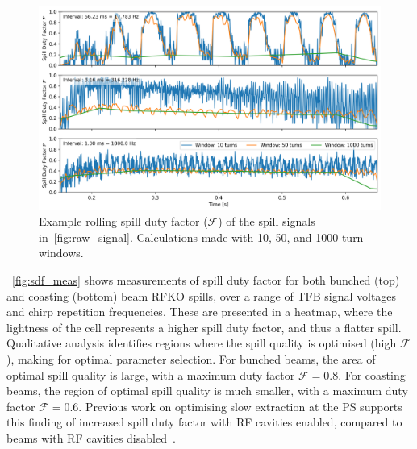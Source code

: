 \documentclass[a4paper,twoside,11pt]{report}
\begin{document}
\begin{figure}
  \centering
  \includegraphics[width=0.8\linewidth]{sdfs.png}
  \caption[Example spill duty factor calculations]{Example rolling spill duty factor ($\mathcal{F}$) of the spill signals in~\autoref{fig:raw_signal}. Calculations made with 10, 50, and 1000 turn windows.}\label{fig:sdf_example}
\end{figure}

~\autoref{fig:sdf_meas} shows measurements of spill duty factor for both bunched (top) and coasting (bottom) beam RFKO spills, over a range of TFB signal voltages and chirp repetition frequencies. These are presented in a heatmap, where the lightness of the cell represents a higher spill duty factor, and thus a flatter spill. Qualitative analysis identifies regions where the spill quality is optimised (high $\mathcal{F}$), making for optimal parameter selection. For bunched beams, the area of optimal spill quality is large, with a maximum duty factor $\mathcal{F} = 0.8$. For coasting beams, the region of optimal spill quality is much smaller, with a maximum duty factor $\mathcal{F} = 0.6$. Previous work on optimising slow extraction at the PS supports this finding of increased spill duty factor with RF cavities enabled, compared to beams with RF cavities disabled~\cite{Cappi:134321}.
\end{document}
